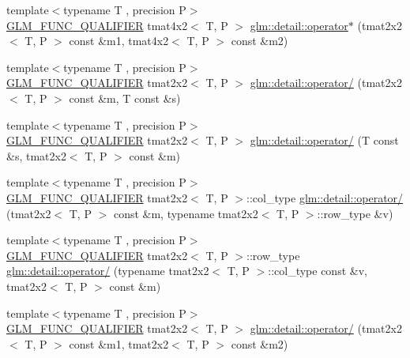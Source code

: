 \begin{DoxyCompactItemize}
\item 
{\footnotesize template$<$typename T , precision P$>$ }\\\hyperlink{setup_8hpp_a33fdea6f91c5f834105f7415e2a64407}{G\+L\+M\+\_\+\+F\+U\+N\+C\+\_\+\+Q\+U\+A\+L\+I\+F\+I\+ER} tmat4x2$<$ T, P $>$ \hyperlink{namespaceglm_1_1detail_a0e6a2a148182b006a1ad0c595ba50a4e}{glm\+::detail\+::operator$\ast$} (tmat2x2$<$ T, P $>$ const \&m1, tmat4x2$<$ T, P $>$ const \&m2)
\item 
{\footnotesize template$<$typename T , precision P$>$ }\\\hyperlink{setup_8hpp_a33fdea6f91c5f834105f7415e2a64407}{G\+L\+M\+\_\+\+F\+U\+N\+C\+\_\+\+Q\+U\+A\+L\+I\+F\+I\+ER} tmat2x2$<$ T, P $>$ \hyperlink{namespaceglm_1_1detail_a4c6595a56a61663e1bc682ae2640bce3}{glm\+::detail\+::operator/} (tmat2x2$<$ T, P $>$ const \&m, T const \&s)
\item 
{\footnotesize template$<$typename T , precision P$>$ }\\\hyperlink{setup_8hpp_a33fdea6f91c5f834105f7415e2a64407}{G\+L\+M\+\_\+\+F\+U\+N\+C\+\_\+\+Q\+U\+A\+L\+I\+F\+I\+ER} tmat2x2$<$ T, P $>$ \hyperlink{namespaceglm_1_1detail_addc2c93d0a77b2ee0a3eba202838387f}{glm\+::detail\+::operator/} (T const \&s, tmat2x2$<$ T, P $>$ const \&m)
\item 
{\footnotesize template$<$typename T , precision P$>$ }\\\hyperlink{setup_8hpp_a33fdea6f91c5f834105f7415e2a64407}{G\+L\+M\+\_\+\+F\+U\+N\+C\+\_\+\+Q\+U\+A\+L\+I\+F\+I\+ER} tmat2x2$<$ T, P $>$\+::col\+\_\+type \hyperlink{namespaceglm_1_1detail_a501e188c7ac0173ce4fadd0d523c0acf}{glm\+::detail\+::operator/} (tmat2x2$<$ T, P $>$ const \&m, typename tmat2x2$<$ T, P $>$\+::row\+\_\+type \&v)
\item 
{\footnotesize template$<$typename T , precision P$>$ }\\\hyperlink{setup_8hpp_a33fdea6f91c5f834105f7415e2a64407}{G\+L\+M\+\_\+\+F\+U\+N\+C\+\_\+\+Q\+U\+A\+L\+I\+F\+I\+ER} tmat2x2$<$ T, P $>$\+::row\+\_\+type \hyperlink{namespaceglm_1_1detail_ae0c60b66649d093dea52f050de494090}{glm\+::detail\+::operator/} (typename tmat2x2$<$ T, P $>$\+::col\+\_\+type const \&v, tmat2x2$<$ T, P $>$ const \&m)
\item 
{\footnotesize template$<$typename T , precision P$>$ }\\\hyperlink{setup_8hpp_a33fdea6f91c5f834105f7415e2a64407}{G\+L\+M\+\_\+\+F\+U\+N\+C\+\_\+\+Q\+U\+A\+L\+I\+F\+I\+ER} tmat2x2$<$ T, P $>$ \hyperlink{namespaceglm_1_1detail_a2553d5605bcb4a06d9d7a5e9113a4cfb}{glm\+::detail\+::operator/} (tmat2x2$<$ T, P $>$ const \&m1, tmat2x2$<$ T, P $>$ const \&m2)

\end{DoxyCompactItemize}
